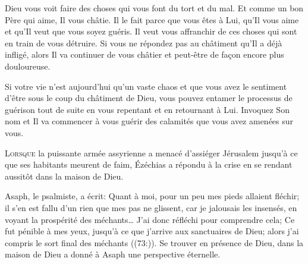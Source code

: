 Dieu vous voit faire des choses qui vous font du tort et du mal.
 Et comme un bon Père qui aime, Il vous châtie.
 Il le fait parce que vous êtes à Lui, qu'Il vous aime
 et qu'Il veut que vous soyez guéris.
 Il veut vous affranchir de ces choses qui sont en train de vous détruire.
 Si vous ne répondez pas au châtiment qu'Il a déjà infligé,
 alors Il va continuer de vous châtier
 \ocadr et peut-être de fa\c{c}on encore plus douloureuse. 

Si votre vie n'est aujourd'hui qu'un vaste chaos et que vous avez le sentiment
 d'être sous le coup du châtiment de Dieu, vous pouvez entamer le processus
 de guérison tout de suite en vous repentant et en retournant à Lui.
 Invoquez Son nom et Il va commencer à vous guérir des calamités
 que vous avez amenées sur vous. 

\dvrule







\lettrine{L}{orsque} la puissante armée assyrienne a menacé d'assiéger
 Jérusalem jusqu'à ce que ses habitants meurent de faim,
 Ézéchias a répondu à la crise en se rendant aussitôt
 dans la maison de Dieu. 


Asaph, le psalmiste, a écrit: 
 \Og Quant à moi, pour un peu mes pieds allaient fléchir;
 il s’en est fallu d’un rien que mes pas ne glissent,
 car je jalousais les insensés, en voyant la prospérité des méchants\dots{}
 J’ai donc réfléchi pour comprendre cela; Ce fut pénible à mes yeux,
 jusqu’à ce que j’arrive aux sanctuaires de Dieu;
 alors j’ai compris le sort final des méchants \Fg{} ((73:)).
 Se trouver en présence de Dieu, dans la maison de Dieu
 a donné à Asaph une perspective éternelle. 

